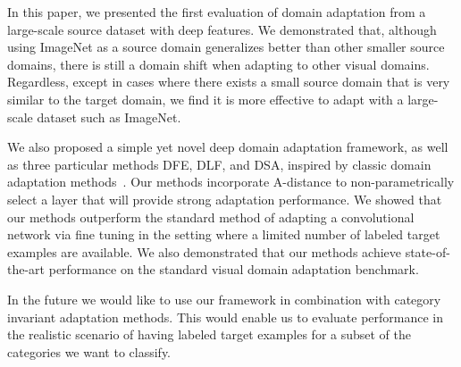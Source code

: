 In this paper, we presented the first evaluation of domain adaptation from a
large-scale source dataset with deep features. We demonstrated that, although
using ImageNet as a source domain generalizes better than other smaller source
domains, there is still a domain shift when adapting to other visual domains.
Regardless, except in cases where there exists a small source domain that is
very similar to the target domain, we find it is more effective to adapt with
a large-scale dataset such as ImageNet.

We also proposed a simple yet novel deep domain adaptation framework, as well as
three particular methods DFE, DLF, and DSA, inspired by classic domain
adaptation methods~\cite{daume, sa}. Our methods incorporate A-distance to
non-parametrically select a layer that will provide strong adaptation
performance. We showed that our methods outperform the standard method of
adapting a convolutional network via fine tuning in the setting where a limited
number of labeled target examples are available. We also demonstrated that our
methods achieve state-of-the-art performance on the standard visual domain
adaptation benchmark.

In the future we would like to use our framework in combination with category invariant adaptation methods. This would enable us to evaluate performance in the realistic scenario of having labeled target examples for a subset of the categories we want to classify. 
